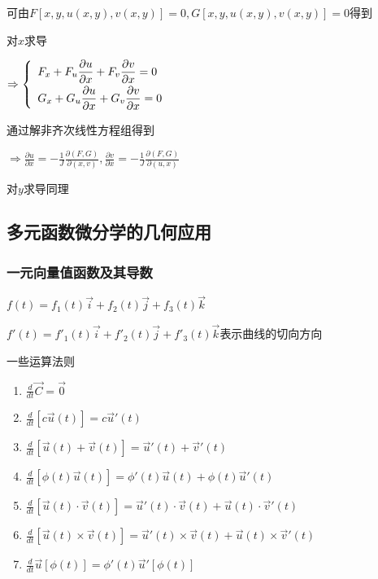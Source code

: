 \documentclass{article} %
\begin{document}
可由$F[x,y,u(x,y),v(x,y)]=0,G[x,y,u(x,y),v(x,y)]=0$得到\par
对$x$求导\par
$\displaystyle\Rightarrow 
    \left\{\begin{array}{l}
        \displaystyle F_x+F_u\frac{\partial u}{\partial x}+F_v\frac{\partial v}{\partial x}=0\vspace{1mm}\\
        \displaystyle G_x+G_u\frac{\partial u}{\partial x}+G_v\frac{\partial v}{\partial x}=0\\
    \end{array}\right.$\vspace{2mm}\par
通过解非齐次线性方程组得到\par
$\displaystyle
\Rightarrow
\frac{\partial u}{\partial x}=-\frac{1}{J}\frac{\partial (F,G)}{\partial (x,v)},
\frac{\partial v}{\partial x}=-\frac{1}{J}\frac{\partial (F,G)}{\partial (u,x)}
$
\par
对$y$求导同理

\subsection{多元函数微分学的几何应用}
\subsubsection{一元向量值函数及其导数}
$f(t)=f_1(t)\vec{i}+f_2(t)\vec{j}+f_3(t)\vec{k}$\par
$f'(t)=f'_1(t)\vec{i}+f'_2(t)\vec{j}+f'_3(t)\vec{k}$表示曲线的切向方向\par
\vspace{3mm}
一些运算法则
\begin{enumerate}
    \item $\displaystyle\frac{d}{dt}\vec{C}=\vec{0}$
    \item $\displaystyle\frac{d}{dt}[c\vec{u}(t)]=c\vec{u}'(t)$
    \item $\displaystyle\frac{d}{dt}[\vec{u}(t)+\vec{v}(t)]=\vec{u}'(t)+\vec{v}'(t)$
    \item $\displaystyle\frac{d}{dt}[\phi(t)\vec{u}(t)]=\phi'(t)\vec{u}(t)+\phi(t)\vec{u}'(t)$
    \item $\displaystyle\frac{d}{dt}[\vec{u}(t)\cdot\vec{v}(t)]=\vec{u}'(t)\cdot\vec{v}(t)+\vec{u}(t)\cdot\vec{v}'(t)$
    \item $\displaystyle\frac{d}{dt}[\vec{u}(t)\times\vec{v}(t)]=\vec{u}'(t)\times\vec{v}(t)+\vec{u}(t)\times\vec{v}'(t)$
    \item $\displaystyle\frac{d}{dt}\vec{u}[\phi(t)]=\phi'(t)\vec{u}'[\phi(t)]$
\end{enumerate}
\end{document}
